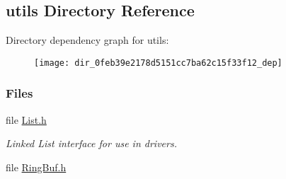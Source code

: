 \subsection{utils Directory Reference}
\label{dir_0feb39e2178d5151cc7ba62c15f33f12}
Directory dependency graph for utils\+:
\nopagebreak
\begin{figure}[H]
\begin{center}
\leavevmode
\texttt{[image: dir\_0feb39e2178d5151cc7ba62c15f33f12\_dep]}
\end{center}
\end{figure}
\subsubsection*{Files}
\begin{DoxyCompactItemize}
\item 
file \hyperlink{_list_8h}{List.\+h}
\begin{DoxyCompactList}\small\item\em Linked List interface for use in drivers. \end{DoxyCompactList}\item 
file \hyperlink{_ring_buf_8h}{Ring\+Buf.\+h}
\end{DoxyCompactItemize}
